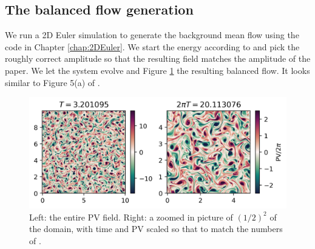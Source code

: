\subsection{The balanced flow generation}
We run a 2D Euler simulation to generate the background mean flow using the code in Chapter \ref{chap:2DEuler}. We start the energy according to \cite[(4.2)]{RochaEtAl_18} and pick the roughly correct amplitude so that the resulting field matches the amplitude of the \cite{RochaEtAl_18} paper. We let the system evolve and Figure \ref{fig:PVbalanced} the resulting balanced flow. It looks similar to Figure 5(a) of \cite{RochaEtAl_18}. 
\begin{figure}[h]
    \centering
    \includegraphics{PVbalanced}
    \caption{Left: the entire PV field. Right: a zoomed in picture of $(1/2)^2$ of the domain, with time and PV scaled so that to match the numbers of \cite{RochaEtAl_18}.}
    \label{fig:PVbalanced}
\end{figure}

